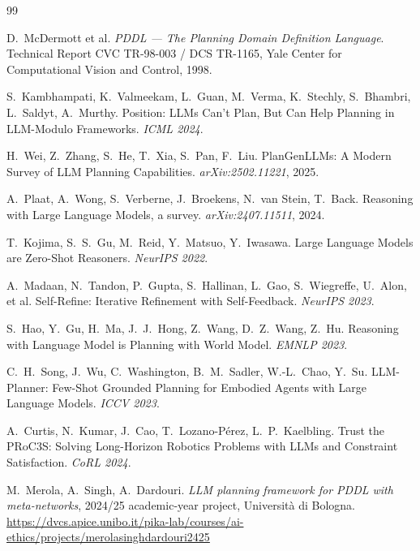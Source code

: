 \documentclass[11pt,a4paper]{article}
\begin{document}
\begin{thebibliography}{99}

D.~McDermott et al.
\newblock \emph{PDDL --- The Planning Domain Definition Language}.
\newblock Technical Report CVC TR-98-003 / DCS TR-1165, Yale Center for
Computational Vision and Control, 1998.

S.~Kambhampati, K.~Valmeekam, L.~Guan, M.~Verma, K.~Stechly,
S.~Bhambri, L.~Saldyt, A.~Murthy.
\newblock Position: LLMs Can't Plan, But Can Help Planning in
LLM-Modulo Frameworks.
\newblock \emph{ICML 2024}.

H.~Wei, Z.~Zhang, S.~He, T.~Xia, S.~Pan, F.~Liu.
\newblock PlanGenLLMs: A Modern Survey of LLM Planning Capabilities.
\newblock \emph{arXiv:2502.11221}, 2025.

A.~Plaat, A.~Wong, S.~Verberne, J.~Broekens, N.~van Stein, T.~Back.
\newblock Reasoning with Large Language Models, a survey.
\newblock \emph{arXiv:2407.11511}, 2024.

T.~Kojima, S.~S.~Gu, M.~Reid, Y.~Matsuo, Y.~Iwasawa.
\newblock Large Language Models are Zero-Shot Reasoners.
\newblock \emph{NeurIPS 2022}.

A.~Madaan, N.~Tandon, P.~Gupta, S.~Hallinan, L.~Gao, S.~Wiegreffe,
U.~Alon, et al.
\newblock Self-Refine: Iterative Refinement with Self-Feedback.
\newblock \emph{NeurIPS 2023}.

S.~Hao, Y.~Gu, H.~Ma, J.~J.~Hong, Z.~Wang, D.~Z.~Wang, Z.~Hu.
\newblock Reasoning with Language Model is Planning with World Model.
\newblock \emph{EMNLP 2023}.

C.~H.~Song, J.~Wu, C.~Washington, B.~M.~Sadler, W.-L.~Chao, Y.~Su.
\newblock LLM-Planner: Few-Shot Grounded Planning for Embodied
Agents with Large Language Models.
\newblock \emph{ICCV 2023}.

A.~Curtis, N.~Kumar, J.~Cao, T.~Lozano-P\'erez, L.~P.~Kaelbling.
\newblock Trust the PRoC3S: Solving Long-Horizon Robotics Problems
with LLMs and Constraint Satisfaction.
\newblock \emph{CoRL 2024}.

M.~Merola, A.~Singh, A.~Dardouri.
\newblock \emph{LLM planning framework for PDDL with meta-networks},
2024/25 academic-year project, Università di Bologna.
\newblock \url{https://dvcs.apice.unibo.it/pika-lab/courses/ai-ethics/projects/merolasinghdardouri2425}


\end{thebibliography}
\end{document}
